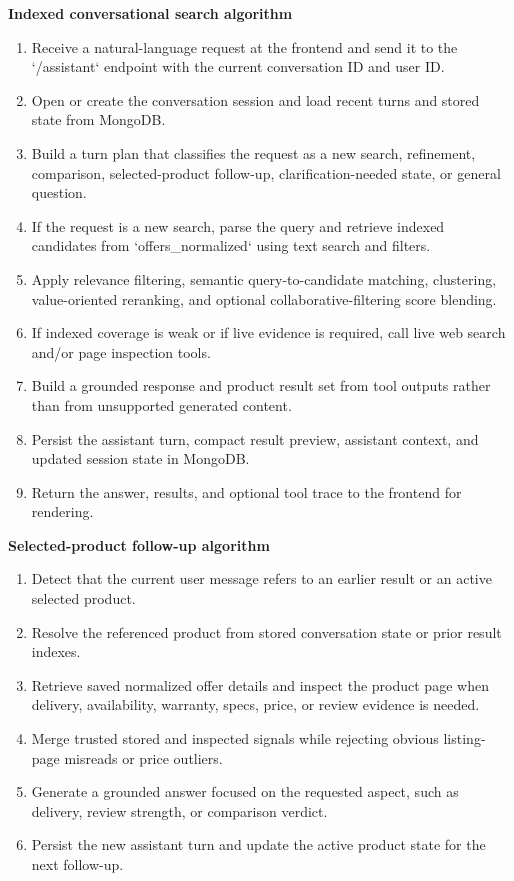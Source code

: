 \documentclass[12pt,a4paper,oneside]{report}
\begin{document}
\textbf{Indexed conversational search algorithm}
\begin{enumerate}[leftmargin=0.35in]
    \item Receive a natural-language request at the frontend and send it to the `/assistant` endpoint with the current conversation ID and user ID.
    \item Open or create the conversation session and load recent turns and stored state from MongoDB.
    \item Build a turn plan that classifies the request as a new search, refinement, comparison, selected-product follow-up, clarification-needed state, or general question.
    \item If the request is a new search, parse the query and retrieve indexed candidates from `offers\_normalized` using text search and filters.
    \item Apply relevance filtering, semantic query-to-candidate matching, clustering, value-oriented reranking, and optional collaborative-filtering score blending.
    \item If indexed coverage is weak or if live evidence is required, call live web search and/or page inspection tools.
    \item Build a grounded response and product result set from tool outputs rather than from unsupported generated content.
    \item Persist the assistant turn, compact result preview, assistant context, and updated session state in MongoDB.
    \item Return the answer, results, and optional tool trace to the frontend for rendering.
\end{enumerate}

\textbf{Selected-product follow-up algorithm}
\begin{enumerate}[leftmargin=0.35in]
    \item Detect that the current user message refers to an earlier result or an active selected product.
    \item Resolve the referenced product from stored conversation state or prior result indexes.
    \item Retrieve saved normalized offer details and inspect the product page when delivery, availability, warranty, specs, price, or review evidence is needed.
    \item Merge trusted stored and inspected signals while rejecting obvious listing-page misreads or price outliers.
    \item Generate a grounded answer focused on the requested aspect, such as delivery, review strength, or comparison verdict.
    \item Persist the new assistant turn and update the active product state for the next follow-up.
\end{enumerate}
\end{document}
